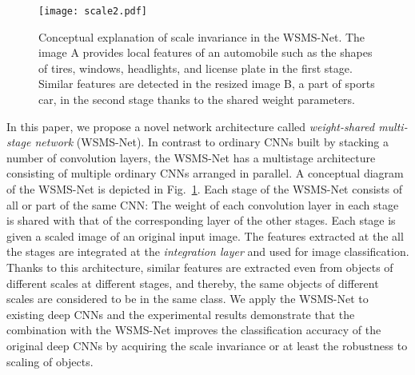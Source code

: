 \documentclass[journal]{IEEEtran}
\begin{document}

\begin{figure}[!t]
\centering
\texttt{[image: scale2.pdf]}
\caption{Conceptual explanation of scale invariance in the WSMS-Net.
The image A provides local features of an automobile such as the shapes of tires, windows, headlights, and license plate in the first stage.
Similar features are detected in the resized image B, a part of sports car, in the second stage thanks to the shared weight parameters.}
\label{fig:scale}
\end{figure}

In this paper, we propose a novel network architecture called \emph{weight-shared multi-stage network} (WSMS-Net).
In contrast to ordinary CNNs built by stacking a number of convolution layers, the WSMS-Net has a multistage architecture consisting of multiple ordinary CNNs arranged in parallel.
A conceptual diagram of the WSMS-Net is depicted in Fig.~\ref{fig:scale}.
Each stage of the WSMS-Net consists of all or part of the same CNN: The weight of each convolution layer in each stage is shared with that of the corresponding layer of the other stages.
Each stage is given a scaled image of an original input image.
The features extracted at the all the stages are integrated at the \emph{integration layer} and used for image classification.
Thanks to this architecture, similar features are extracted even from objects of different scales at different stages, and thereby, the same objects of different scales are considered to be in the same class.
We apply the WSMS-Net to existing deep CNNs and the experimental results demonstrate that the combination with the WSMS-Net improves the classification accuracy of the original deep CNNs by acquiring the scale invariance or at least the robustness to scaling of objects.

\end{document}
